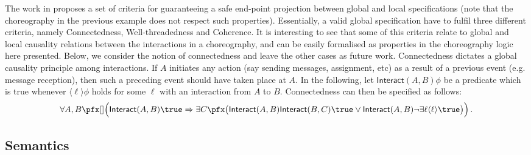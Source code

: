 \begin{example}[Connectedness]
  The work in \cite{carbone7scc} proposes a set of criteria for
  guaranteeing a safe end-point projection between global and local
  specifications (note that the choreography in the previous example
  does not respect such properties). Essentially, a valid global
  specification have to fulfil three different criteria, namely
  Connectedness, Well-threadedness and Coherence.  It is interesting
  to see that some of this criteria relate to global and local
  causality relations between the interactions in a choreography, and
  can be easily formalised as properties in the choreography logic
  here presented. Below, we consider the notion of connectedness and
  leave the other cases as future work. Connectedness dictates a
  global causality principle among interactions. If $A$ initiates any
  action (say sending messages, assignment, etc) as a result of a
  previous event (e.g. message reception), then such a preceding event
  should have taken place at $A$. In the following, let
  $\mathsf{Interact}(A,B)\phi$ be a predicate which is true whenever
  $\langle\ell\rangle\phi$ holds for some $\ell$ with an interaction
  from $A$ to $B$.  Connectedness can then be specified as follows:
  \begin{equation*}
    \forall A,B\pfx
    []
    \Big(
    \mathsf{Interact}(A,B)\true \Rightarrow {}  
    \exists C\pfx 
    \big(\mathsf{Interact}(A,B)\mathsf{Interact}(B,C)\true
    \lor 
    \mathsf{Interact}(A,B)\neg\exists\ell\langle\ell\rangle\true\big)
    \Big) \, . 
  \end{equation*}
\end{example}

\subsection{Semantics}\label{Logic4Struct:logic-assertions}

